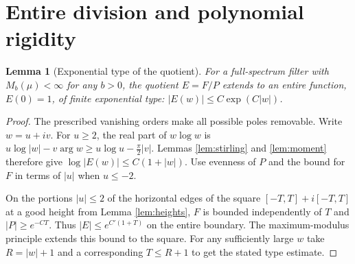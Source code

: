 \documentclass[11pt]{article}
\newtheorem{lemma}[theorem]{Lemma}
\theoremstyle{definition}\newtheorem{definition}[theorem]{Definition}
\theoremstyle{remark}\newtheorem{remark}[theorem]{Remark}
\begin{document}
\section{Entire division and polynomial rigidity}
\begin{lemma}[Exponential type of the quotient]\label{lem:type}
For a full-spectrum filter with $M_b(\mu)<\infty$ for any $b>0$, the quotient $E=F/P$ extends to an entire function, $E(0)=1$, of finite exponential type: $|E(w)|\le C\exp(C|w|)$.
\end{lemma}
\begin{proof}
The prescribed vanishing orders make all possible poles removable. Write $w=u+iv$. For $u\ge2$, the real part of $w\log w$ is $u\log|w|-v\arg w\ge u\log u-\frac\pi2|v|$. Lemmas \ref{lem:stirling} and \ref{lem:moment} therefore give $\log|E(w)|\le C(1+|w|)$. Use evenness of $P$ and the bound for $F$ in terms of $|u|$ when $u\le-2$.

On the portions $|u|\le2$ of the horizontal edges of the square $[-T,T]+i[-T,T]$ at a good height from Lemma \ref{lem:heights}, $F$ is bounded independently of $T$ and $|P|\ge e^{-CT}$. Thus $|E|\le e^{C'(1+T)}$ on the entire boundary. The maximum-modulus principle extends this bound to the square. For any sufficiently large $w$ take $R=|w|+1$ and a corresponding $T\le R+1$ to get the stated type estimate.
\end{proof}
\end{document}
